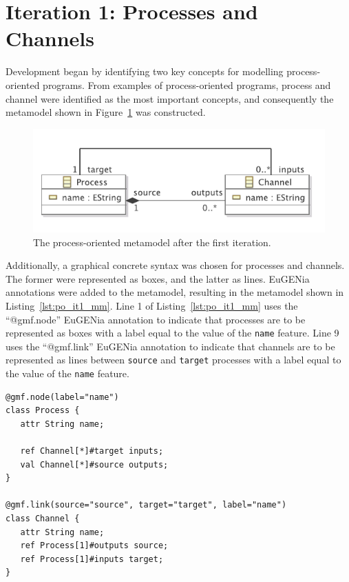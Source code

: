 \section{Iteration 1: Processes and Channels}
Development began by identifying two key concepts for modelling process-oriented programs. From examples of process-oriented programs, process and channel were identified as the most important concepts, and consequently the metamodel shown in Figure~\ref{fig:po_it1_mm} was constructed.


\begin{figure}[htbp]
	\centering
		\includegraphics[scale=0.75]{A.2.ProcessOriented/images/1_mm.pdf}
	\caption{The process-oriented metamodel after the first iteration.}
	\label{fig:po_it1_mm}
\end{figure}

Additionally, a graphical concrete syntax was chosen for processes and channels. The former were represented as boxes, and the latter as lines. EuGENia annotations were added to the metamodel, resulting in the metamodel shown in Listing~\ref{lst:po_it1_mm}. Line 1 of Listing~\ref{lst:po_it1_mm} uses the ``@gmf.node'' EuGENia annotation to indicate that processes are to be represented as boxes with a label equal to the value of the \texttt{name} feature. Line 9 uses the ``@gmf.link'' EuGENia annotation to indicate that channels are to be represented as lines between \texttt{source} and \texttt{target} processes with a label equal to the value of the \texttt{name} feature. 

\begin{lstlisting}[caption=The annotated process-oriented metamodel after the first iteration, label=lst:po_it1_mm, language=Emfatic]
@gmf.node(label="name")
class Process {
   attr String name;
      
   ref Channel[*]#target inputs;
   val Channel[*]#source outputs; 
}

@gmf.link(source="source", target="target", label="name")
class Channel { 
   attr String name;
   ref Process[1]#outputs source;
   ref Process[1]#inputs target;
} 

\end{lstlisting}

